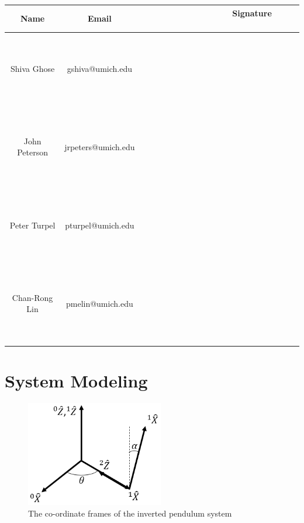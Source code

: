 \documentclass{article}
\theoremstyle{plain}
\theoremstyle{definition}
\theoremstyle{remark}
\begin{document}
\begin{table}[h]
\begin{center}
    \begin{tabular}{|c|c|c|}
        \hline
        \textbf{Name} & \textbf{Email}     & \textbf{ \ \ \ \ \  \ \  \ \ \ \ \  \ \ Signature  \ \ \ \ \  \ \ \ \ \ \ \  \ \ } \\ \hline
        	~& ~& ~\\
	~& ~& ~\\
	Shiva Ghose   & gshiva@umich.edu   & ~                  \\
	~& ~& ~\\
	~& ~& ~\\ \hline 
	~& ~& ~\\
	~& ~& ~\\
        John Peterson & jrpeters@umich.edu & ~                  \\ 
	~& ~& ~\\
	~& ~& ~\\ \hline 
	~& ~& ~\\
	~& ~& ~\\
        Peter Turpel   & pturpel@umich.edu & ~                  \\
	~& ~& ~\\
	~& ~& ~\\ \hline 
	~& ~& ~\\
	~& ~& ~\\
        Chan-Rong Lin   & pmelin@umich.edu & ~                  \\
	~& ~& ~\\
	~& ~& ~\\ \hline 
        \hline
    \end{tabular}
\end{center}
\end{table}

\newpage

\section{System Modeling}

\begin{figure}[htb]
\begin{center}
\includegraphics[width = 6cm]{coordinates.png}
\caption{The co-ordinate frames of the inverted pendulum system}
\label{q1_coords}
\end{center}
\end{figure}
\end{document}
